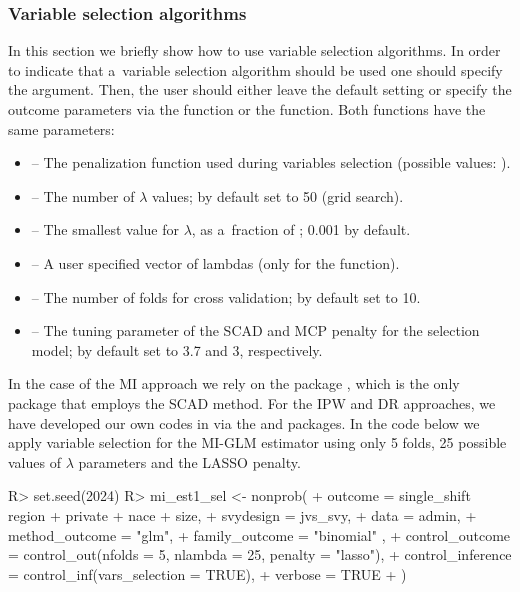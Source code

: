 \documentclass[
]{jss}
\begin{document}
\subsubsection{Variable selection
algorithms}\label{variable-selection-algorithms}

In this section we briefly show how to use variable selection
algorithms. In order to indicate that a~variable selection algorithm
should be used one should specify the
 argument.
Then, the user should either leave the default setting or specify the
outcome parameters via the  function or the
 function. Both functions have the same parameters:

\begin{itemize}
\item {} -- The penalization function used during variables selection (possible values: ).
\item {} -- The number of $\lambda$ values; by default set to 50 (grid search).
\item {} -- The smallest value for $\lambda$, as a~fraction of ; 0.001 by default.
\item {} -- A user specified vector of lambdas (only for the  function).
\item {} -- The number of folds for cross validation; by default set to 10.
\item {} -- The tuning parameter of the SCAD and MCP penalty for the selection model; by default set to 3.7 and 3, respectively.
\end{itemize}

In the case of the MI approach we rely on the  package
\citep{ncvreg}, which is the only  package that employs the
SCAD method. For the IPW and DR approaches, we have developed our own
codes in  via the  and 
packages. In the code below we apply variable selection for the MI-GLM
estimator using only 5 folds, 25 possible values of \(\lambda\)
parameters and the LASSO penalty.

\begin{CodeChunk}
\begin{CodeInput}
R> set.seed(2024)
R> mi_est1_sel <- nonprob(
+   outcome = single_shift ~ region + private + nace + size,
+   svydesign = jvs_svy,
+   data = admin,
+   method_outcome = "glm",
+   family_outcome = "binomial" ,
+   control_outcome = control_out(nfolds = 5, nlambda = 25, penalty = "lasso"),
+   control_inference = control_inf(vars_selection = TRUE),
+   verbose = TRUE
+ )
\end{CodeInput}
\end{CodeChunk}
\end{document}
